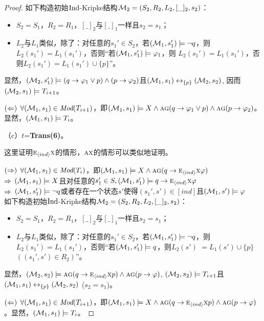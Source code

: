 \begin{proof}
	如下构造初始$\textrm{Ind}$-Kripke结构${\cal M}_2=(S_2,R_2,L_2,[\_]_2,s_2)$：
	\begin{itemize}
		\item $S_2=S_1$，$R_2=R_1$，$[\_]_2$与$[\_]_1$一样且$s_2=s_1$；
		\item $L_2$与$L_1$类似，除了：对任意的$s_1'\in S_2$，若$({\cal M}_1, s_1') \models \neg q$，则$L_2(s_1') = L_1(s_1')$，否则“若$({\cal M}_1,s_1') \models \varphi_1$，则 $L_2(s_1')=L_1(s_1')$，否则$L_2(s_1')=L_1(s_1') \cup \{p\}$”。
	\end{itemize}
	显然，$({\cal M}_2,s_1') \models (q\rightarrow \varphi_1 \vee p) \wedge (p \rightarrow \varphi_2)$且$({\cal M}_1, s_1) \leftrightarrow_{\{p\}} ({\cal M}_2, s_2)$, 因而$({\cal M}_2,s_1) \models T_{i+1}$。
	
	$(\Leftarrow)$  $\forall ({\cal M}_1, s_1) \in \textit{Mod}(T_{i+1})$，即$({\cal M}_1,s_1) \models X \wedge \textsc{a}\textsc{g} (q\rightarrow \varphi_1 \vee p) \wedge \textsc{a}\textsc{g}(p \rightarrow \varphi_2)$。 显然，$({\cal M}_1, s_1) \models T_i$。
	
	（c）$t$=\textbf{Trans(6)}。
	
	这里证明$\textsc{e}_{{\langle{ind}\rangle}} \textsc{x}$的情形，$\textsc{a} \textsc{x}$的情形可以类似地证明。
	
	$(\Rightarrow)$ $\forall({\cal M}_1,s_1) \in \textit{Mod}(T_i)$，即$({\cal M}_1,s_1) \models X \wedge \textsc{a}\textsc{g}(q \rightarrow \textsc{e}_{{\langle{ind}\rangle}}\textsc{x} \varphi)$\\
	$\Rightarrow$ $({\cal M}_1,s_1) \models X$且对任意的$s_1'\in S, ({\cal M}_1,s_1') \models q \rightarrow \textsc{e}_{{\langle{ind}\rangle}} \textsc{x} \varphi$\\
	$\Rightarrow$ $({\cal M}_1,s_1') \models \neg q$或者存在一个状态$s'$使得$(s_1', s') \in [ind]$且$({\cal M}_1,s') \models \varphi$\\
	
	如下构造初始$\textrm{Ind}$-Kripke结构${\cal M}_2=(S_2,R_2,L_2,[\_]_2,s_2)$：
	\begin{itemize}
		\item $S_2=S_1$，$R_2=R_1$，$[\_]_2$与$[\_]_1$一样且$s_2=s_1$；
		\item $L_2$与$L_1$类似，除了：对任意的$s_1'\in S_2$，若$({\cal M}_1, s_1') \models \neg q$，则$L_2(s_1') = L_1(s_1')$，否则“若$({\cal M}_1,s_1') \models q$，则$L_2(s')$ $=L_1(s')\cup \{p\}$ $((s_1',s')\in R_2)$”。
	\end{itemize}
	显然，$({\cal M}_2,s_2) \models \textsc{a}\textsc{g}(q\rightarrow \textsc{e}_{{\langle{ind}\rangle}} \textsc{x} p) \wedge \textsc{a}\textsc{g}(p \rightarrow \varphi)$, $({\cal M}_2,s_2) \models T_{i+1}$且$({\cal M}_1, s_1) \leftrightarrow_{\{p\}} ({\cal M}_2, s_2)$ ($s_2=s_1$)。
	
	$(\Leftarrow)$ $\forall({\cal M}_1, s_1) \in \textit{Mod}(T_{i+1})$，即$({\cal M}_1,s_1) \models X \wedge \textsc{a}\textsc{g}(q\rightarrow \textsc{e}_{{\langle{ind}\rangle}} \textsc{x} p) \wedge \textsc{a}\textsc{g}(p \rightarrow \varphi)$。显然，$({\cal M}_1, s_1) \models T_i$。
\end{proof}

